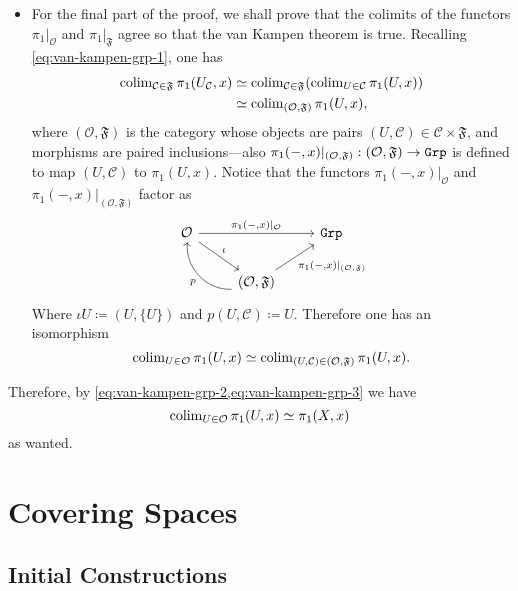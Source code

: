 \begin{itemize}
\item For the final part of the proof, we shall prove that the colimits of the
  functors \(\pi_1|_{\mathcal{O}}\) and \(\pi_1|_{\mathfrak{F}}\) agree so that
  the van Kampen theorem is true. Recalling \cref{eq:van-kampen-grp-1}, one has
  \begin{align*}
  \operatorname{colim}_{\mathcal{C} \in \mathfrak{F}} \pi_1(U_{\mathcal{C}}, x)
  &\simeq
  \operatorname{colim}_{\mathcal{C} \in \mathfrak{F}}(\operatorname{colim}_{U \in \mathcal{C}} \pi_1(U, x)) \\
  &\simeq
  \operatorname{colim}_{(\mathcal{O}, \mathfrak{F})} \pi_1(U, x),
  \end{align*}
  where \((\mathcal{O}, \mathfrak{F})\) is the category whose objects are pairs
  \((U, \mathcal{C}) \in \mathcal{C} \times \mathfrak{F}\), and morphisms are
  paired inclusions---also
  \(\pi_1(-, x)|_{(\mathcal{O}, \mathfrak{F})}: (\mathcal{O}, \mathfrak{F}) \to
  {\texttt{Grp}}\) is defined to map \((U, \mathcal{C})\) to \(\pi_1(U, x)\). Notice that
  the functors \(\pi_1(-, x)|_{\mathcal{O}}\) and
  \(\pi_1(-, x)|_{(\mathcal{O}, \mathfrak{F})}\) factor as
  \[
  \begin{tikzcd}
  \mathcal{O} \ar[rr, "\pi_1{(-, x)}|_{\mathcal{O}}"] \ar[rd, "\iota"]
  & &\Grp \\
  &(\mathcal{O}, \mathfrak{F})
  \ar[ru, "\pi_1{(-, x)}|_{(\mathcal{O}, \mathfrak F)}"']
  \ar[lu, bend left=50, "p"] &
  \end{tikzcd}
  \]
  Where \(\iota U \coloneq (U, \{U\})\) and \(p (U, \mathcal{C}) \coloneq
  U\). Therefore one has an isomorphism
  \begin{equation}\label{eq:van-kampen-grp-3}
  \operatorname{colim}_{U \in \mathcal{O}} \pi_1(U, x)
  \simeq
  \operatorname{colim}_{(U, \mathcal{C}) \in (\mathcal{O}, \mathfrak F)} \pi_1(U, x).
  \end{equation}
\end{itemize}
Therefore, by \cref{eq:van-kampen-grp-2,eq:van-kampen-grp-3} we have
\[
\operatorname{colim}_{U \in \mathcal{O}} \pi_1(U, x) \simeq \pi_1(X, x)
\]
as wanted.

\section{Covering Spaces}

\subsection{Initial Constructions}

